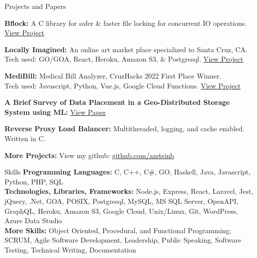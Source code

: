\documentclass{resume} %
\begin{document}
\begin{rSection}{Projects and Papers}

    {\bf{Bflock:}} A C library for safer \& faster file locking for concurrent IO operations. \href{https://github.com/azsteinb/BetterFileLocks}{View Project}
    
    {\bf{Locally Imagined:}} An online art market place specialized to Santa Cruz, CA.
    \\ Tech used: GO/GOA, React, Heroku, Amazon S3, \& Postgresql. \href{https://github.com/locally-imagined}{View Project}
    
    {\bf{MediBill:}} Medical Bill Analyzer, CruzHacks 2022 First Place Winner.
    \\Tech used: Javascript, Python, Vue.js, Google Cloud Functions. \href{https://devpost.com/software/health-hacker-7soucr}{View Project}
    
    {\bf{A Brief Survey of Data Placement in a Geo-Distributed Storage System using ML}: } \href{https://docs.google.com/document/u/1/d/e/2PACX-1vRi_JSl3urSJMr-Mj7rZGkyrPzMANauaqdgXekPwFfHyUSlrkR0azLyoCxT_S0u2tvndypQ5d6vsJwy/pub}{View Paper}
    
    {\bf{Reverse Proxy Load Balancer:} } Multithreaded, logging, and cache enabled. Written in C.
    
    {\bf{More Projects:} } View my github: \href{https://github.com/azsteinb}{github.com/azsteinb}
\end{rSection}

\begin{rSection}{Skills}
    {\bf{Programming Languages:} } C, C++, C\#, GO, Haskell, Java, Javascript, Python, PHP, SQL
    \\{\bf{Technologies, Libraries, Frameworks:} } Node.js, Express, React, Laravel, Jest, jQuery, .Net, GOA, POSIX, Postgresql, MySQL, MS SQL Server, OpenAPI, GraphQL, Heroku, Amazon S3, Google Cloud, Unix/Linux, Git, WordPress, Azure Data Studio
    \\{\bf{More Skills:} } Object Oriented, Procedural, and Functional Programming; SCRUM, Agile Software Development, Leadership, Public Speaking, Software Testing, Technical Writing, Documentation
\end{rSection}
    
\end{document}
